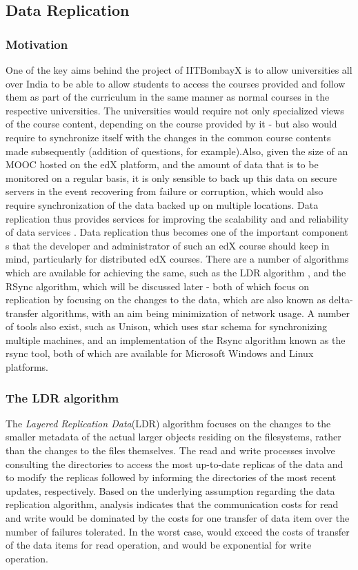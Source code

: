\documentclass[14pt]{article}
\begin{document}
\subsection{Data Replication}

\subsubsection{Motivation}
One of the key aims behind the project of IITBombayX is to allow universities all over India to be able to allow students to access the courses provided and follow them as part of the curriculum in the same manner as normal courses in the respective universities. The universities would require not only specialized views of the course content, depending on the course provided by it - but also would require to synchronize itself with the changes in the common course contents made subsequently (addition of questions, for example).Also, given the size of an MOOC hosted on the edX platform, and the amount of data that is to be monitored on a regular basis, it is only sensible to back up this data on secure servers in the event recovering from failure or corruption, which would also require synchronization of the data backed up on multiple locations. Data replication thus provides services for improving the scalability and and reliability of data services \cite{fan2003efficient}. Data replication thus becomes one of the important component s that the developer and administrator of such an edX course should keep in mind, particularly for distributed edX courses. There are a number of algorithms which are available for achieving the same, such as the LDR algorithm \cite{fan2003efficient}, and the RSync algorithm, which will be discussed later - both of which focus on replication by focusing on the changes to the data, which are also known as delta-transfer algorithms, with an aim being minimization of network usage. A number of tools also exist, such as Unison, which uses star schema for synchronizing multiple machines, and an implementation of the Rsync algorithm known as the rsync tool, both of which are available for Microsoft Windows and Linux platforms.

\subsubsection{The LDR algorithm}
The \emph{Layered Replication Data}(LDR) algorithm \cite{fan2003efficient} focuses on the changes to the smaller metadata of the actual larger objects residing on the filesystems, rather than the changes to the files themselves. The read and write processes involve consulting the directories to access the most up-to-date replicas of the data and to modify the replicas followed by informing the directories of the most recent updates, respectively. Based on the underlying assumption regarding the data replication algorithm, analysis indicates that the communication costs for read and write would be dominated by the costs for one transfer of data item over the number of failures tolerated. In the worst case, would exceed the costs of transfer of the data items for read operation, and would be exponential for write operation.
\end{document}
